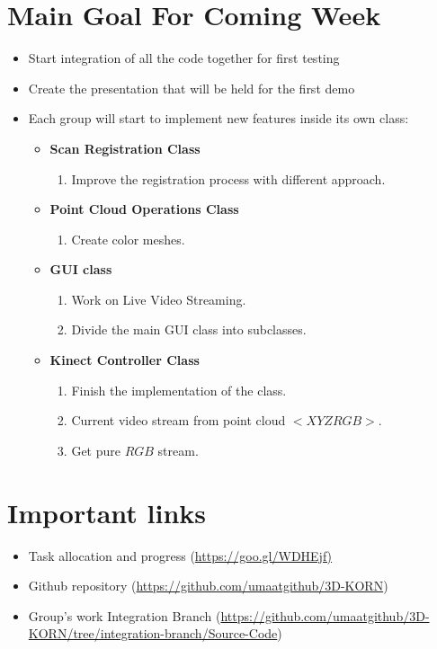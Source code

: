 \documentclass[11pt]{article} %
\begin{document}
\section{Main Goal For Coming Week}

\begin{itemize}

\item Start integration of all the code together for first testing

\item Create the presentation that will be held for the first demo


\item Each group will start to implement new features inside its own class:
\begin{itemize}
	
	\item \textbf{Scan Registration Class} 
	\begin{enumerate}
		\item Improve the registration process with different approach.
	\end{enumerate}
	
	
	\item \textbf{Point Cloud Operations Class}
\begin{enumerate}
	\item Create color meshes.
\end{enumerate}

	\item \textbf{GUI class}
	\begin{enumerate}
		\item Work on Live Video Streaming.
		\item Divide the main GUI class into subclasses.
	\end{enumerate}

	\item \textbf{Kinect Controller Class}
	\begin{enumerate}
		\item Finish the implementation of the class.
		\item Current video stream from point cloud $<XYZRGB>$.
		\item Get pure $RGB$ stream.
	\end{enumerate}
	
\end{itemize}




\end{itemize}

\section{Important links}
\begin{itemize}
\item Task allocation and progress  (\url{https://goo.gl/WDHEjf)}
\item Github repository (\url{https://github.com/umaatgithub/3D-KORN})
\item Group's work Integration Branch  (\url{https://github.com/umaatgithub/3D-KORN/tree/integration-branch/Source-Code}) 
\end{itemize}
\end{document}
